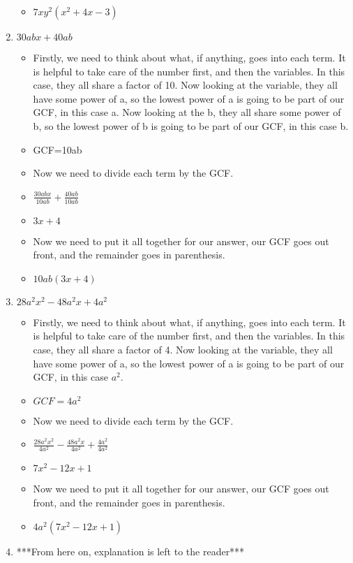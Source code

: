 \documentclass{article}
\begin{document}
\begin{enumerate}
\begin{itemize}
  \item $7xy^{2}(x^{2}+4x-3)$
  \end{itemize}
\item $30abx + 40ab$
  \begin{itemize}
  \item Firstly, we need to think about what, if anything, goes into each term. It is helpful to take care of the number first, and then the variables. In this case, they all share a factor of 10. Now looking at the variable, they all have some power of a, so the lowest power of a is going to be part of our GCF, in this case a. Now looking at the b, they all share some power of b, so the lowest power of b is going to be part of our GCF, in this case b.
  \item [] GCF=10ab
  \item Now we need to divide each term by the GCF.
  \item [] {\Large $\frac{30abx}{10ab} + \frac{40ab}{10ab}$}
  \item [] $3x+4$
  \item Now we need to put it all together for our answer, our GCF goes out front, and the remainder goes in parenthesis.
  \item $10ab(3x+4)$ 
  \end{itemize}
\item $28a^{2}x^{2} - 48a^{2}x + 4a^{2}$
  \begin{itemize}
  \item Firstly, we need to think about what, if anything, goes into each term. It is helpful to take care of the number first, and then the variables. In this case, they all share a factor of 4. Now looking at the variable, they all have some power of a, so the lowest power of a is going to be part of our GCF, in this case $a^{2}$.
  \item [] $GCF=4a^{2}$
  \item Now we need to divide each term by the GCF.
  \item [] {\Large $\frac{28a^{2}x^{2}}{4a^{2}} - \frac{48a^{2}x}{4a^{2}} + \frac{4a^{2}}{4a^{2}}$}
  \item [] $7x^{2}-12x+1$
  \item Now we need to put it all together for our answer, our GCF goes out front, and the remainder goes in parenthesis.
  \item [] $4a^{2}(7x^{2}-12x+1)$
  \end{itemize}
\item [] ***From here on, explanation is left to the reader***

\end{enumerate}
\end{document}
